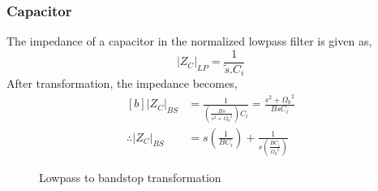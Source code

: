 \subsubsection*{Capacitor}
The impedance of a capacitor in the normalized lowpass filter is given as, 
$$
|Z_C|_{LP}=\frac{1}{\tilde{s}.C_{i}}
$$
After transformation, the impedance becomes,
\begin{equation}
   \begin{aligned}[b]
      |Z_C|_{BS}&=\frac{1}{\left(\frac{Bs}{s^2+{\Omega_0}^2}\right)C_{i}}=\frac{s^2+{\Omega_0}^2}{BsC_i}\\
      \therefore |Z_C|_{BS}&=s\left(\frac{1}{BC_i}\right)+\frac{1}{s\left(\frac{BC_i}{{\Omega_0}^2}\right)}
   \end{aligned}
   \label{eqn:c_bs}
\end{equation}

\begin{figure}[H]
   \centering
   \lpbs
   \caption{Lowpass to bandstop transformation}
   \label{fig:lpbs}
\end{figure}

